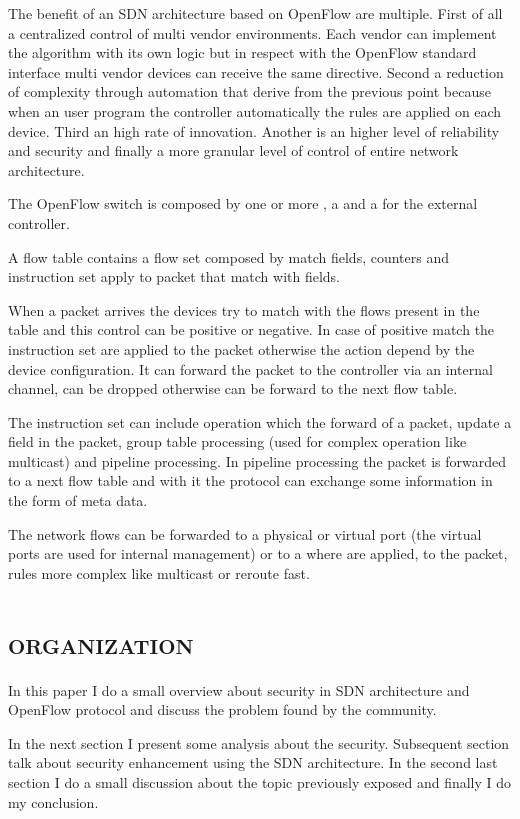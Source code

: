 The benefit of an \ac{SDN} architecture based on OpenFlow are multiple. First of all a centralized control of multi vendor environments. Each vendor can implement the algorithm with its own logic but in respect with the OpenFlow standard interface multi vendor devices can receive the same directive. Second a reduction of complexity through automation that derive from the previous point because when an user program the controller automatically the rules are applied on each device. Third an high rate of innovation. Another is an higher level of reliability and security and finally a more granular level of control of entire network architecture.

The OpenFlow switch is composed by one or more , a  and a  for the external controller.

A flow table contains a flow set composed by match fields, counters and instruction set apply to packet that match with fields.

When a packet arrives the devices try to match with the flows present in the table and this control can be positive or negative. In case of positive match the instruction set are applied to the packet otherwise the action depend by the device configuration. It can forward the packet to the controller via an internal channel, can be dropped otherwise can be forward to the next flow table.

The instruction set can include operation which the forward of a packet, update a field in the packet, group table processing (used for complex operation like multicast) and pipeline processing. In pipeline processing the packet is forwarded to a next flow table and with it the protocol can exchange some information in the form of meta data.

The network flows can be forwarded to a physical or virtual port (the virtual ports are used for internal management) or to a  where are applied, to the packet, rules more complex like multicast or reroute fast.

\section*{\small \textsc{organization}}
In this paper I do a small overview about security in \ac{SDN} architecture and OpenFlow protocol and discuss the problem found by the community.

In the next section I present some analysis about the security. Subsequent section talk about security enhancement using the \ac{SDN} architecture. In the second last section I do a small discussion about the topic previously exposed and finally I do my conclusion.